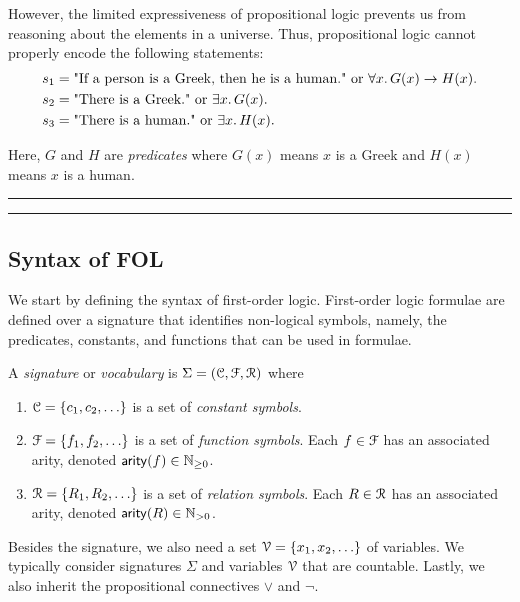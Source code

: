\documentclass[11pt,usenames, dvipsnames]{article}
\begin{document}
However, the limited expressiveness of propositional logic prevents us from reasoning about the elements in a universe. Thus, propositional logic cannot properly encode the following statements:
\begin{align*}
  s_1 &= \text{"If a person is a Greek, then he is a human." or } \forall x \ldotp G(x) \rightarrow H(x).
  \\
  s_2 &= \text{"There is a Greek." or } \exists x \ldotp G(x).
  \\
  s_3 &= \text{"There is a human." or } \exists x \ldotp H(x).
\end{align*}

Here, $G$ and $H$ are \emph{predicates} where $G(x)$ means $x$ is a Greek and $H(x)$ means $x$ is a human.

\vspace{5truemm}
\hrule
\hrule

\subsection*{\large \centering Syntax of FOL}
\noindent

We start by defining the syntax of first-order logic. First-order logic formulae are defined over a signature that identifies non-logical symbols, namely, the predicates, constants, and functions that can be used in formulae.

\begin{definition}[Signature]
  A \emph{signature} or \emph{vocabulary} is $\Sigma = (\conn, \func, \reln)$ where
  \begin{enumerate}
    \item $\conn = \{c_1, c_2, \ldots \}$ is a set of \emph{constant symbols}.
    \item $\func = \{f_1, f_2, \ldots\}$ is a set of \emph{function symbols}. Each $f \in \func$ has an associated arity, denoted $\mathsf{arity}(f) \in \mathbb{N}_{\ge 0}$.
    \item $\reln = \{R_1, R_2, \ldots\}$ is a set of \emph{relation symbols}. Each $R \in \reln$ has an associated arity, denoted $\mathsf{arity}(R) \in \mathbb{N}_{> 0}$.
  \end{enumerate}
\end{definition}

Besides the signature, we also need a set $\vars = \{x_1, x_2, \ldots\}$ of variables. We typically consider signatures $\Sigma$ and variables $\vars$ that are countable. Lastly, we also inherit the propositional connectives $\vee$ and $\neg$.
\end{document}
